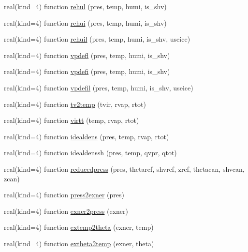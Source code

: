 \begin{DoxyCompactItemize}
\item 
real(kind=4) function \hyperlink{namespacetherm__lib_a28012fb3e93800daaed6b23dc389937c}{rehul} (pres, temp, humi, is\+\_\+shv)
\item 
real(kind=4) function \hyperlink{namespacetherm__lib_a897c8c9126106d615513b59bf83c2dca}{rehui} (pres, temp, humi, is\+\_\+shv)
\item 
real(kind=4) function \hyperlink{namespacetherm__lib_a41cd91c2aa39b6b956a791e3260e27e2}{rehuil} (pres, temp, humi, is\+\_\+shv, useice)
\item 
real(kind=4) function \hyperlink{namespacetherm__lib_a6f84a6e1d410eb7f89dd59a9f6a13f3b}{vpdefl} (pres, temp, humi, is\+\_\+shv)
\item 
real(kind=4) function \hyperlink{namespacetherm__lib_a638ed06adfde6beea4477cb9bddc699f}{vpdefi} (pres, temp, humi, is\+\_\+shv)
\item 
real(kind=4) function \hyperlink{namespacetherm__lib_af6ca165844a5da4f2d21a37aa3fff081}{vpdefil} (pres, temp, humi, is\+\_\+shv, useice)
\item 
real(kind=4) function \hyperlink{namespacetherm__lib_a0ac9a85555ff45eb6d4de4ca94045eb8}{tv2temp} (tvir, rvap, rtot)
\item 
real(kind=4) function \hyperlink{namespacetherm__lib_adfb18489c8037340578e62f5643197f7}{virtt} (temp, rvap, rtot)
\item 
real(kind=4) function \hyperlink{namespacetherm__lib_a5a9775d62adebc1ad0473596c7f51649}{idealdens} (pres, temp, rvap, rtot)
\item 
real(kind=4) function \hyperlink{namespacetherm__lib_a60b714e3ae5457604df59afaf6904acd}{idealdenssh} (pres, temp, qvpr, qtot)
\item 
real(kind=4) function \hyperlink{namespacetherm__lib_ad37c9d26367d1a2678cd1875d21f05fd}{reducedpress} (pres, thetaref, shvref, zref, thetacan, shvcan, zcan)
\item 
real(kind=4) function \hyperlink{namespacetherm__lib_a4e2091a1a5d89a568a252369122ecb39}{press2exner} (pres)
\item 
real(kind=4) function \hyperlink{namespacetherm__lib_ae8677da076662844975419a4a4c74919}{exner2press} (exner)
\item 
real(kind=4) function \hyperlink{namespacetherm__lib_a547dc1767e5cae792b356d615db3ea09}{extemp2theta} (exner, temp)
\item 
real(kind=4) function \hyperlink{namespacetherm__lib_a04fbafe4252bacbd01867388f45d8104}{extheta2temp} (exner, theta)
\item 

\end{DoxyCompactItemize}
